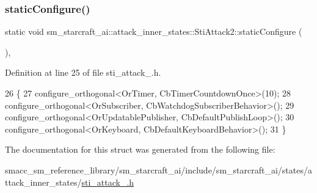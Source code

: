 \subsubsection{\texorpdfstring{static\+Configure()}{staticConfigure()}}
{\footnotesize\ttfamily static void sm\+\_\+starcraft\+\_\+ai\+::attack\+\_\+inner\+\_\+states\+::\+Sti\+Attack2\+::static\+Configure (\begin{DoxyParamCaption}{ }\end{DoxyParamCaption})\hspace{0.3cm}{\ttfamily [inline]}, {\ttfamily [static]}}



Definition at line 25 of file sti\+\_\+attack\+\_.\+h.


\begin{DoxyCode}
26   \{
27     configure\_orthogonal<OrTimer, CbTimerCountdownOnce>(10);
28     configure\_orthogonal<OrSubscriber, CbWatchdogSubscriberBehavior>();
29     configure\_orthogonal<OrUpdatablePublisher, CbDefaultPublishLoop>();
30     configure\_orthogonal<OrKeyboard, CbDefaultKeyboardBehavior>();
31   \}
\end{DoxyCode}


The documentation for this struct was generated from the following file\+:\begin{DoxyCompactItemize}
\item 
smacc\+\_\+sm\+\_\+reference\+\_\+library/sm\+\_\+starcraft\+\_\+ai/include/sm\+\_\+starcraft\+\_\+ai/states/attack\+\_\+inner\+\_\+states/\hyperlink{sti__attack__2_8h}{sti\+\_\+attack\+\_.\+h}\end{DoxyCompactItemize}
